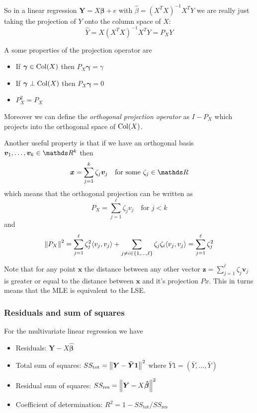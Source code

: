 \documentclass[12pt]{extarticle}
\renewcommand{\vec}[1]{\bm{#1}}
\begin{document}
So in a linear regression $\vec Y = X \vec \beta + e$ with $\hat \beta = (X^T X)^{-1} X^T Y$
we are really just taking the projection of $Y$ onto the column space of $X$:
\begin{equation}
    \hat Y = X (X^T X)^{-1} X^T Y = P_X Y
\end{equation}

A some properties of the projection operator are
\begin{itemize}
    \item If $\vec \gamma \in {\operatorfont Col}(X)$ then $P_X \vec \gamma = \gamma$
    \item If $\vec \gamma \perp{\operatorfont Col}(X)$ then $P_X \vec \gamma = 0$
    \item $P_X^2 = P_X$
\end{itemize}

Moreover we can define the \emph{orthogonal projection operator} as $I - P_X$
which projects into the orthogonal space of ${\operatorfont Col}(X)$.

Another useful property is that if we have an orthogonal basis $\vec v_1, \dots, \vec v_k \in \R^k$
then
\begin{equation}
    \vec x = \sum_{j = 1}^k \zeta_j \vec v_j \quad \text{for some } \zeta_j \in \R
\end{equation}
which means that the orthogonal projection can be written as
\begin{equation}
    P_X = \sum_{j = 1}^\ell \zeta_j v_j \quad \text{for } j < k
\end{equation}
and
\begin{equation}
    \norm{P_X}^2
    = \sum_{j = 1}^\ell \zeta_j ^2 \langle v_j, v_j \rangle + \sum_{j \neq i \in \{ 1, \dots, \ell \}} \zeta_j \zeta_i\langle v_j, v_j \rangle
    = \sum^\ell_{j = 1} \zeta_j^2
\end{equation}

Note that for any point $\vec x$ the distance between any other vector $\vec z = \sum_{j = 1}^\ell \zeta_j \vec v_j$
is greater or equal to the distance between $\vec x$ and it's projection $Px$.
This in turns means that the MLE is equivalent to the LSE.

\subsubsection{Residuals and sum of squares}

For the multivariate linear regression we have
\begin{itemize}
    \item Residuals: $\vec Y - X \vec{\hat \beta}$
    \item Total sum of squares: $SS_\text{tot} = \norm{\vec Y - \vec{\bar Y1}}^2$ where $\bar Y1 = (\bar Y, \dots, \bar Y)$
    \item Residual sum of squares: $SS_\text{res} = \norm{\vec Y - X \vec{\hat\beta}}^2$
    \item Coefficient of determination: $R^2 = 1 - SS_\text{tot}/ SS_\text{res}$
\end{itemize}
\end{document}
